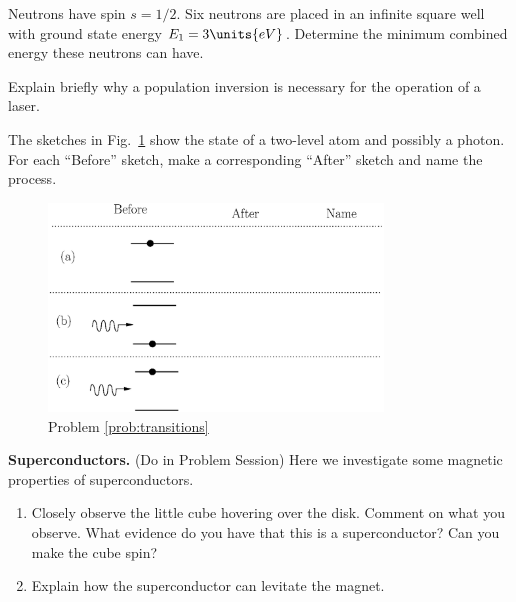 
\begin{problem}
  Neutrons have spin $s=1/2$.  Six neutrons are placed in an
infinite square well with ground state energy $E_1 = 3\units{eV}$.  Determine
the minimum combined energy these neutrons can have.
\end{problem}

\begin{problem}
  Explain briefly why a population inversion is necessary for the
  operation of a laser.
\end{problem}


\newpage

\begin{problem}
  The sketches in Fig.~\ref{fig:stim_emission} show the state of a two-level
  atom and possibly a photon.  For each ``Before'' sketch, make a
  corresponding ``After'' sketch and name the process.
  \label{prob:transitions}

  \begin{figure}[h]
    \begin{center}
      \includegraphics[width=3.5in]{additional_problems/transitions}
      \caption{Problem \ref{prob:transitions}}
      \label{fig:stim_emission}
    \end{center}
  \end{figure}
\end{problem}

\begin{problem}
  {\bf Superconductors.} (Do in Problem Session) Here we investigate
  some magnetic properties of superconductors.

  \begin{enumerate} 
  \item Closely observe the little cube hovering over the disk.
    Comment on what you observe.  What evidence do you have that this
    is a superconductor?  Can you make the cube spin?

  \item Explain how the superconductor can levitate the magnet.

  \end{enumerate}
\end{problem}


